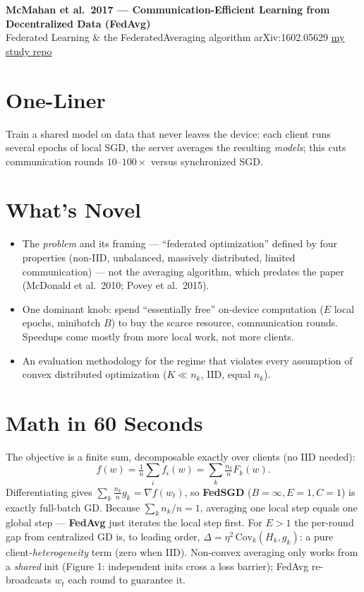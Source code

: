 \documentclass[10pt]{article}
\begin{document}
\begin{center}
  {\Large\textbf{McMahan et al.\ 2017 --- Communication-Efficient Learning from Decentralized Data (FedAvg)}}\\[2pt]
  {\small Federated Learning \& the FederatedAveraging algorithm \quad\textbar\quad arXiv:1602.05629 \quad\textbar\quad \href{https://github.com/pleyva2004/communication-efficient-learning-of-deep-networks}{my study repo}}
\end{center}

\section*{One-Liner}
Train a shared model on data that never leaves the device: each client runs several epochs of local SGD, the server averages the resulting \emph{models}; this cuts communication rounds $10$--$100\times$ versus synchronized SGD.

\section*{What's Novel}
\begin{itemize}
  \item The \emph{problem} and its framing --- ``federated optimization'' defined by four properties (non-IID, unbalanced, massively distributed, limited communication) --- not the averaging algorithm, which predates the paper (McDonald et al.\ 2010; Povey et al.\ 2015).
  \item One dominant knob: spend ``essentially free'' on-device computation ($E$ local epochs, minibatch $B$) to buy the scarce resource, communication rounds. Speedups come mostly from more local work, not more clients.
  \item An evaluation methodology for the regime that violates every assumption of convex distributed optimization ($K\!\ll\!n_k$, IID, equal $n_k$).
\end{itemize}

\section*{Math in 60 Seconds}
The objective is a finite sum, decomposable exactly over clients (no IID needed):
$$ f(w)=\tfrac{1}{n}\textstyle\sum_i f_i(w)=\sum_{k}\tfrac{n_k}{n}F_k(w). $$
Differentiating gives $\sum_k \tfrac{n_k}{n}g_k=\nabla f(w_t)$, so \textbf{FedSGD} ($B{=}\infty,E{=}1,C{=}1$) is exactly full-batch GD. Because $\sum_k n_k/n=1$, averaging one local step equals one global step --- \textbf{FedAvg} just iterates the local step first. For $E>1$ the per-round gap from centralized GD is, to leading order, $\Delta=\eta^2\,\mathrm{Cov}_k(H_k,g_k)$: a pure client-\emph{heterogeneity} term (zero when IID). Non-convex averaging only works from a \emph{shared} init (Figure 1: independent inits cross a loss barrier); FedAvg re-broadcasts $w_t$ each round to guarantee it.
\end{document}
